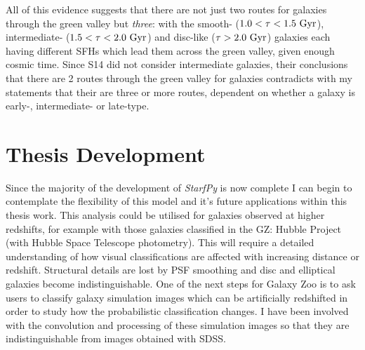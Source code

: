 \documentclass{mn2e}
\begin{document}
All of this evidence suggests that there are not just two routes for galaxies through the green valley but \emph{three}: with the smooth- ($1.0 < \tau < 1.5 ~\rm{Gyr}$), intermediate- ($1.5 < \tau < 2.0~\rm{Gyr}$) and disc-like ($\tau > 2.0~\rm{Gyr}$) galaxies each having different SFHs which lead them across the green valley, given enough cosmic time. Since S14 did not consider intermediate galaxies, their conclusions that there are 2 routes through the green valley for galaxies contradicts with my statements that their are three or more routes, dependent on whether a galaxy is early-, intermediate- or late-type. 



\section{Thesis Development}\label{thesis}


Since the majority of the development of \emph{StarfPy} is now complete I can begin to contemplate the flexibility of this model and it's future applications within this thesis work. This analysis could be utilised for galaxies observed at higher redshifts, for example with those galaxies classified in the GZ: Hubble Project (with Hubble Space Telescope photometry). This will require a detailed understanding of how visual classifications are affected with increasing distance or redshift. Structural details are lost by PSF smoothing and disc and elliptical galaxies become indistinguishable. One of the next steps for Galaxy Zoo is to ask users to classify galaxy simulation images which can be artificially redshifted in order to study how the probabilistic classification changes. I have been involved with the convolution and processing of these simulation images so that they are indistinguishable from images obtained with SDSS. 
\end{document}
